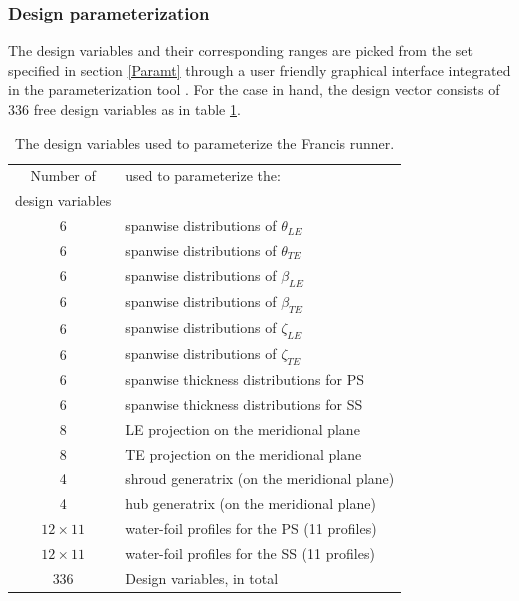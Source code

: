 \subsubsection{Design parameterization}
The design variables and their corresponding ranges are picked from the set specified in section \ref{Paramt} through a user friendly graphical interface integrated in the parameterization tool \cite{dipl_livia,dipl_simon}.  For the case in hand, the design vector consists of $336$ free design variables as in table \ref{design_vars}.




\begin{table}[h!]
\begin{center}
\begin{tabular}{ |c|l| }
\hline

Number of              & used to parameterize the:\\
design variables       & \\
\hline
6 & spanwise distributions of $\theta_{LE}$\\
\hline
6 & spanwise distributions of $\theta_{TE}$\\
\hline
6 & spanwise distributions of $\beta_{LE}$\\
\hline
6 & spanwise distributions of $\beta_{TE}$\\
\hline
6 & spanwise distributions of $\zeta_{LE}$\\
\hline
6 & spanwise distributions of $\zeta_{TE}$\\
\hline
6 & spanwise thickness distributions for PS \\
\hline
6 & spanwise thickness distributions for SS\\
\hline
8 & LE projection on the meridional plane\\
\hline
8 & TE projection on the meridional plane\\
\hline
4 & shroud generatrix (on the meridional plane) \\
\hline
4 & hub generatrix (on the meridional plane)\\
\hline
$12 \times 11$ & water-foil profiles for the PS (11 profiles)\\
\hline
$12 \times 11$ & water-foil profiles for the SS (11 profiles)\\
\hline
\hline
336 & Design variables, in total \\
\hline   
\end{tabular}
\caption{
The design variables used to parameterize the Francis runner.}
\label{design_vars}
\end{center}
\end{table}

